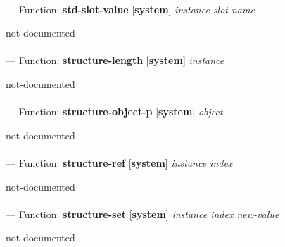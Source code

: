 \paragraph{}
\label{SYSTEM:STD-SLOT-VALUE}
--- Function: \textbf{std-slot-value} [\textbf{system}] \textit{instance slot-name}

\begin{adjustwidth}{5em}{5em}
not-documented
\end{adjustwidth}

\paragraph{}
\label{SYSTEM:STRUCTURE-LENGTH}
--- Function: \textbf{structure-length} [\textbf{system}] \textit{instance}

\begin{adjustwidth}{5em}{5em}
not-documented
\end{adjustwidth}

\paragraph{}
\label{SYSTEM:STRUCTURE-OBJECT-P}
--- Function: \textbf{structure-object-p} [\textbf{system}] \textit{object}

\begin{adjustwidth}{5em}{5em}
not-documented
\end{adjustwidth}

\paragraph{}
\label{SYSTEM:STRUCTURE-REF}
--- Function: \textbf{structure-ref} [\textbf{system}] \textit{instance index}

\begin{adjustwidth}{5em}{5em}
not-documented
\end{adjustwidth}

\paragraph{}
\label{SYSTEM:STRUCTURE-SET}
--- Function: \textbf{structure-set} [\textbf{system}] \textit{instance index new-value}

\begin{adjustwidth}{5em}{5em}
not-documented
\end{adjustwidth}


